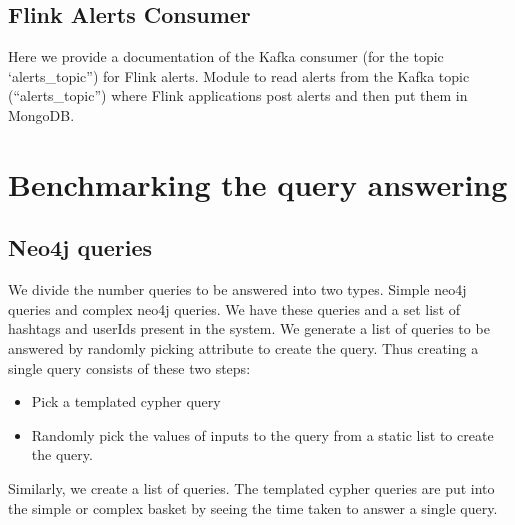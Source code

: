 \documentclass[letterpaper,10pt,english]{sphinxmanual}
\begin{document}
\section{Flink Alerts Consumer}
\label{\detokenize{flink:flink-alerts-consumer}}
Here we provide a documentation of the Kafka consumer (for the topic ‘alerts\_topic”) for Flink alerts.
\label{\detokenize{flink:module-kafka_flink_alerts_consumer}}
Module to read alerts from the Kafka topic (“alerts\_topic”) where Flink applications post alerts and then put them in MongoDB.

\begin{fulllineitems}
\label{\detokenize{flink:kafka_flink_alerts_consumer.insert_records}}
\end{fulllineitems}



\chapter{Benchmarking the query answering}
\label{\detokenize{benchmarking:benchmarking-the-query-answering}}\label{\detokenize{benchmarking::doc}}

\section{Neo4j queries}
\label{\detokenize{benchmarking:neo4j-queries}}
We divide the number queries to be answered into two types. Simple  neo4j queries and complex neo4j queries. We have these queries and a set list of hashtags and userIds present in the system. We generate a list of queries to be answered by randomly picking attribute to create the query. Thus creating a single query consists of these two steps:
\begin{itemize}
\item {} 
Pick a templated cypher query

\item {} 
Randomly pick the values of inputs to the query from a static list to create the query.

\end{itemize}

Similarly, we create a list of queries. The templated cypher queries are put into the simple or complex basket by seeing the time taken to answer a single query.
\end{document}

